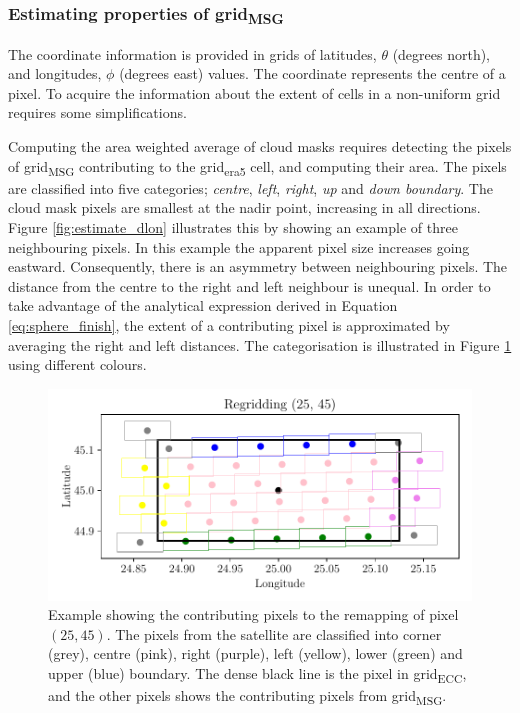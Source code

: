 \subsubsection{Estimating properties of grid\textsubscript{MSG}}
The coordinate information is provided in grids of latitudes, $\theta$ (degrees north), and longitudes, $\phi$ (degrees east) values. The coordinate represents the centre of a pixel. To acquire the information about the extent of cells in a non-uniform grid requires some simplifications. 

Computing the area weighted average of cloud masks requires detecting the pixels of grid\textsubscript{MSG}
contributing to the grid\textsubscript{\acrshort{era5}} cell, and computing their area. The pixels are classified into five categories; \textit{centre}, \textit{left}, \textit{right}, \textit{up} and \textit{down boundary}.
The cloud mask pixels are smallest at the nadir point, increasing in all directions. Figure \ref{fig:estimate_dlon} illustrates this by showing an example of three neighbouring pixels. In this example the apparent pixel size increases going eastward. Consequently, there is an asymmetry between neighbouring pixels. The distance from the centre to the right and left neighbour is unequal. In order to take advantage of the analytical expression derived in Equation \eqref{eq:sphere_finish}, the extent of a contributing pixel is approximated by averaging the right and left distances. The categorisation is illustrated in Figure \ref{fig:pixels_contributing_to_cell} using different colours.

\begin{figure}
    \centering
    \includegraphics{python_figs/example_remapping_lat45_lon25.pdf}
    \caption{Example showing the contributing pixels to the remapping of pixel $(25, 45)$. The pixels from the satellite are classified into corner (grey), centre (pink), right (purple), left (yellow), lower (green) and upper (blue) boundary. The dense black line is the pixel in grid\textsubscript{ECC}, and the other pixels shows the contributing pixels from grid\textsubscript{MSG}.}
    \label{fig:pixels_contributing_to_cell}
\end{figure}


